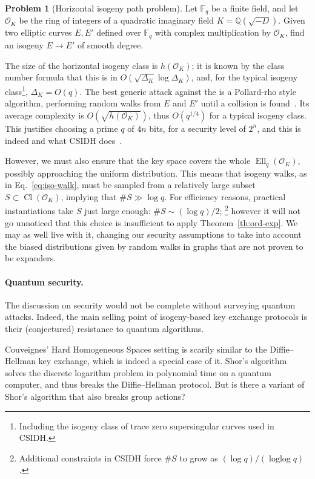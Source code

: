 \documentclass[10pt]{article}
\theoremstyle{plain}
\theoremstyle{definition}
\newtheorem{problem}{Problem}
\DeclareMathOperator{\loglog}{loglog}
\DeclareMathOperator{\Cl}{Cl}
\DeclareMathOperator{\Ell}{Ell}
\def\F{\ensuremath{\mathbb{F}}}
\def\O{\ensuremath{\mathcal{O}}}
\begin{document}
\begin{problem}[Horizontal isogeny path problem]
  \label{prob:hiwp}
  Let $\F_q$ be a finite field, and let $\O_K$ be the ring of integers
  of a quadratic imaginary field $K=ℚ(\sqrt{-D})$. %
  Given two elliptic curves $E,E'$ defined over $\F_q$ with complex
  multiplication by $\O_K$, find an isogeny $E→E'$ of smooth degree.
\end{problem}

The size of the horizontal isogeny class is $h(\O_K)$; it is known by
the class number formula that this is in $O(\sqrt{Δ_K}\log Δ_K)$, and,
for the typical isogeny class\footnote{Including the isogeny class of
  trace zero supersingular curves used in CSIDH.}, $Δ_K=O(q)$. %
The best generic attack against the  is a
Pollard-rho style algorithm, performing random walks from $E$ and $E'$
until a collision is found~\cite{GHS}. %
Its average complexity is $O(\sqrt{h(\O_K)})$, thus $O(q^{1/4})$ for a
typical isogeny class. %
This justifies choosing a prime $q$ of $4n$ bits, for a security level
of $2^n$, and this is indeed and what CSIDH
does~\cite{AC:CLMPR18}.

However, we must also ensure that the key space covers the whole
$\Ell_q(\O_K)$, possibly approaching the uniform distribution. %
This means that isogeny walks, as in Eq.~\eqref{eq:iso-walk}, must be
sampled from a relatively large subset $S⊂\Cl(\O_K)$, implying that
$\#S\gg \log q$. %
For efficiency reasons, practical instantiations take $S$ just large
enough: $\#S\sim (\log q)/2$;%
\footnote{Additional constraints in CSIDH force $\#S$ to grow as
  $(\log q)/(\loglog q)$.} %
however it will not go unnoticed that this choice is insufficient to
apply Theorem~\ref{th:ord-exp}. %
We may as well live with it, changing our security assumptions to take
into account the biased distributions given by random walks in graphs
that are not proven to be expanders. %

\paragraph{Quantum security.}
The discussion on security would not be complete without surveying
quantum attacks. %
Indeed, the main selling point of isogeny-based key exchange protocols
is their (conjectured) resistance to quantum algorithms. %

Couveignes' Hard Homogeneous Spaces setting is scarily similar to the
Diffie--Hellman key exchange, which is indeed a special case of it. %
Shor's algorithm~\cite{FOCS:Shor94} solves the discrete logarithm
problem in polynomial time on a quantum computer, and thus breaks the
Diffie--Hellman protocol. %
But is there a variant of Shor's algorithm that also breaks group
actions? %
\end{document}
